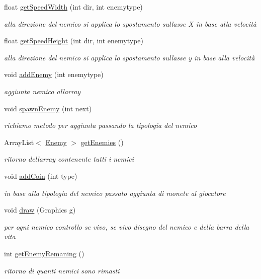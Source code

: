 \begin{DoxyCompactItemize}
float \hyperlink{classmanagers_1_1_enemy_manager_ae622455c9dd19d2583b9a8840b1b35de}{get\+Speed\+Width} (int dir, int enemytype)
\begin{DoxyCompactList}\small\item\em alla direzione del nemico si applica lo spostamento sull\textquotesingle{}asse X in base alla velocità \end{DoxyCompactList}\item 
float \hyperlink{classmanagers_1_1_enemy_manager_a263c83da9aebeac50b60770fb847f331}{get\+Speed\+Height} (int dir, int enemytype)
\begin{DoxyCompactList}\small\item\em alla direzione del nemico si applica lo spostamento sull\textquotesingle{}asse y in base alla velocità \end{DoxyCompactList}\item 
void \hyperlink{classmanagers_1_1_enemy_manager_a24695d90cee943c6c64c2d9f1b231285}{add\+Enemy} (int enemytype)
\begin{DoxyCompactList}\small\item\em aggiunta nemico all\textquotesingle{}array \end{DoxyCompactList}\item 
void \hyperlink{classmanagers_1_1_enemy_manager_a3714d243133c700dca12625cccf518aa}{spawn\+Enemy} (int next)
\begin{DoxyCompactList}\small\item\em richiamo metodo per aggiunta passando la tipologia del nemico \end{DoxyCompactList}\item 
Array\+List$<$ \hyperlink{classenemies_1_1_enemy}{Enemy} $>$ \hyperlink{classmanagers_1_1_enemy_manager_aaa1e04fb149c24d658ce085e7ea30c74}{get\+Enemies} ()
\begin{DoxyCompactList}\small\item\em ritorno dell\textquotesingle{}array contenente tutti i nemici \end{DoxyCompactList}\item 
void \hyperlink{classmanagers_1_1_enemy_manager_a9f0f7dc28e596d2ebcd06e27ef05d9fd}{add\+Coin} (int type)
\begin{DoxyCompactList}\small\item\em in base alla tipologia del nemico passato aggiunta di monete al giocatore \end{DoxyCompactList}\item 
void \hyperlink{classmanagers_1_1_enemy_manager_a72fe1ffca978e99fd16994a10e7f8051}{draw} (Graphics g)
\begin{DoxyCompactList}\small\item\em per ogni nemico controllo se vivo, se vivo disegno del nemico e della barra della vita \end{DoxyCompactList}\item 
int \hyperlink{classmanagers_1_1_enemy_manager_ad8dae58d52717b5f26d7dc654d1c1361}{get\+Enemy\+Remaning} ()
\begin{DoxyCompactList}\small\item\em ritorno di quanti nemici sono rimasti \end{DoxyCompactList}\end{DoxyCompactItemize}
